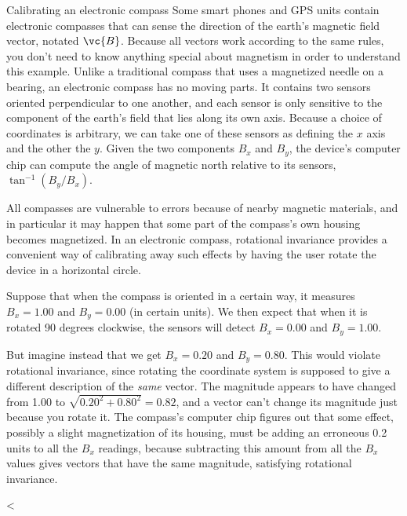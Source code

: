 \begin{eg}{Calibrating an electronic compass}
Some smart phones and GPS units contain electronic compasses that can sense the direction of the earth's magnetic
field vector, notated $\vc{B}$. Because all vectors work according to the same rules, you don't need to know
anything special about magnetism in order to understand this example. 
Unlike a traditional compass that uses a magnetized needle on a bearing, an electronic compass
has no moving parts. It contains two sensors oriented perpendicular to one another, and each sensor is only
sensitive to the component of the earth's field that lies along its own axis. Because a choice of coordinates
is arbitrary, we can take one of these sensors as defining the $x$ axis and the other the $y$. Given the two
components $B_x$ and $B_y$, the device's computer chip can compute the angle of magnetic north relative to its sensors,
$\tan^{-1}(B_y/B_x)$.

All compasses are vulnerable to errors because of nearby magnetic materials, and in particular it may happen
that some part of the compass's own housing becomes magnetized. In an electronic compass, rotational invariance
provides a convenient way of calibrating away such effects by having the user rotate the device in a horizontal circle. 

Suppose that when
the compass is oriented in a certain way, it measures $B_x=1.00$ and $B_y=0.00$ (in certain units).
We then expect that when it is rotated 90 degrees clockwise, the sensors will detect $B_x=0.00$ and $B_y=1.00$.

But imagine instead that we get $B_x=0.20$ and $B_y=0.80$. This would violate rotational invariance, since rotating
the coordinate system is supposed to give a different description of the \emph{same} vector. The magnitude
appears to have changed from 1.00 to $\sqrt{0.20^2+0.80^2}=0.82$, and a vector can't change its magnitude just
because you rotate it. The compass's computer chip figures out that some effect, possibly a slight magnetization of its housing, must
be adding an erroneous 0.2 units to all the $B_x$ readings, because subtracting this amount from all the $B_x$ values gives
vectors that have the same magnitude, satisfying rotational invariance.
\end{eg}

<%

\begin{vocab}




\end{vocab}

